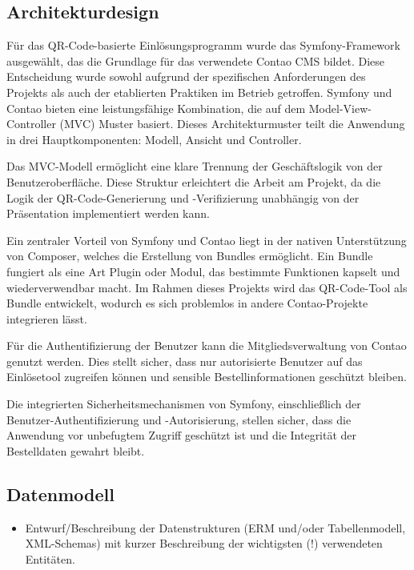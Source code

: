\subsection{Architekturdesign}
\label{sec:Architekturdesign}

Für das QR-Code-basierte Einlösungsprogramm wurde das Symfony-Framework ausgewählt, das die Grundlage für das verwendete Contao CMS bildet. Diese Entscheidung wurde sowohl aufgrund der spezifischen Anforderungen des Projekts als auch der etablierten Praktiken im Betrieb getroffen. Symfony und Contao bieten eine leistungsfähige Kombination, die auf dem Model-View-Controller (MVC) Muster basiert. Dieses Architekturmuster teilt die Anwendung in drei Hauptkomponenten: Modell, Ansicht und Controller.

Das MVC-Modell ermöglicht eine klare Trennung der Geschäftslogik von der Benutzeroberfläche. Diese Struktur erleichtert die Arbeit am Projekt, da die Logik der QR-Code-Generierung und -Verifizierung unabhängig von der Präsentation implementiert werden kann.

Ein zentraler Vorteil von Symfony und Contao liegt in der nativen Unterstützung von Composer, welches die Erstellung von Bundles ermöglicht. Ein Bundle fungiert als eine Art Plugin oder Modul, das bestimmte Funktionen kapselt und wiederverwendbar macht. Im Rahmen dieses Projekts wird das QR-Code-Tool als Bundle entwickelt, wodurch es sich problemlos in andere Contao-Projekte integrieren lässt.

Für die Authentifizierung der Benutzer kann die Mitgliedsverwaltung von Contao genutzt werden. Dies stellt sicher, dass nur autorisierte Benutzer auf das Einlösetool zugreifen können und sensible Bestellinformationen geschützt bleiben.

Die integrierten Sicherheitsmechanismen von Symfony, einschließlich der Benutzer-Authentifizierung und -Autorisierung, stellen sicher, dass die Anwendung vor unbefugtem Zugriff geschützt ist und die Integrität der Bestelldaten gewahrt bleibt.


\subsection{Datenmodell}
\label{sec:Datenmodell}

\begin{itemize}
	\item Entwurf/Beschreibung der Datenstrukturen (\zB \acs{ERM} und/oder Tabellenmodell, \acs{XML}-Schemas) mit kurzer Beschreibung der wichtigsten (!) verwendeten Entitäten.
\end{itemize}

